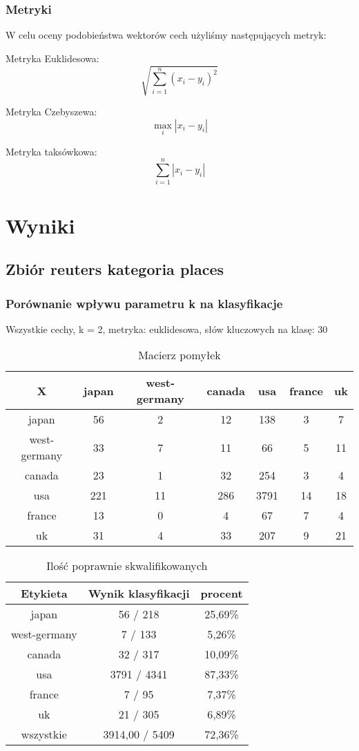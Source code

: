\documentclass{classrep}
\begin{document}
\subsubsection{Metryki}
W celu oceny podobieństwa wektorów cech użyliśmy następujących metryk:

Metryka Euklidesowa:
$${\sqrt {\sum _{i=1}^{n}(x_{i}-y_{i})^{2}}}$$

Metryka Czebyszewa:
$$\max _{i}|x_{i}-y_{i}|$$


Metryka taksówkowa:
$$\sum _{i=1}^{n}|x_{i}-y_{i}|$$


\section{Wyniki}
\subsection{Zbiór reuters kategoria places}
\subsubsection{Porównanie wpływu parametru k na klasyfikacje}
Wszystkie cechy, k = 2, metryka: euklidesowa, słów kluczowych na klasę: 30\newline

\begin{table}[h]
\centering
\begin{tabular}{|c|c|c|c|c|c|c|}
\hline
 X  & japan & west-germany & canada & usa & france & uk\\
\hline
japan & 56 & 2 & 12 & 138 & 3 & 7\\
\hline
west-germany & 33 & 7 & 11 & 66 & 5 & 11\\
\hline
canada & 23 & 1 & 32 & 254 & 3 & 4\\
\hline
usa & 221 & 11 & 286 & 3791 & 14 & 18\\
\hline
france & 13 & 0 & 4 & 67 & 7 & 4\\
\hline
uk & 31 & 4 & 33 & 207 & 9 & 21\\
\hline
\end{tabular}
\caption{Macierz pomyłek}\end{table}

\begin{table}[h]
\centering
\begin{tabular}{|c|c|c|}
\hline
Etykieta & Wynik klasyfikacji & procent\\
\hline
japan & 56 / 218 & 25,69\%\\
\hline
west-germany & 7 / 133 & 5,26\%\\
\hline
canada & 32 / 317 & 10,09\%\\
\hline
usa & 3791 / 4341 & 87,33\%\\
\hline
france & 7 / 95 & 7,37\%\\
\hline
uk & 21 / 305 & 6,89\%\\
\hline
wszystkie & 3914,00 / 5409 & 72,36\%\\
\hline
\end{tabular}
\caption{Ilość poprawnie skwalifikowanych}\end{table}
\end{document}
